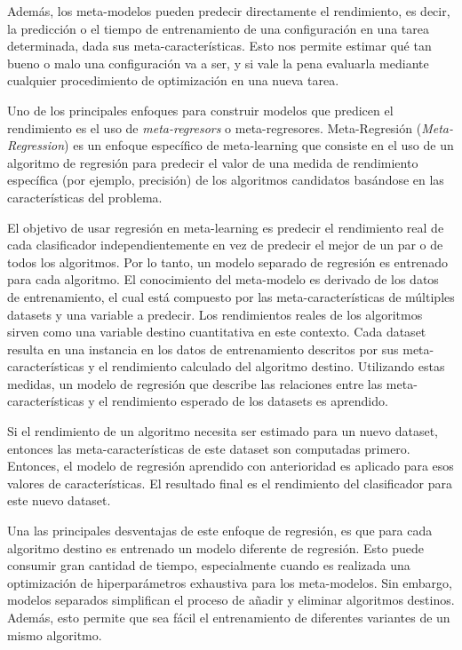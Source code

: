\quad

Además, los meta-modelos pueden predecir directamente el rendimiento, es decir, la predicción o el tiempo de entrenamiento de una configuración en una tarea determinada, dada sus meta-características. Esto nos permite estimar qué tan bueno o malo una configuración va a ser, y si vale la pena evaluarla mediante cualquier procedimiento de optimización en una nueva tarea.

Uno de los principales enfoques para construir modelos que predicen el rendimiento es el uso de \textit{meta-regresors} o meta-regresores. Meta-Regresión  (\textit{Meta-Regression}) es un enfoque específico de meta-learning que consiste en el uso de un algoritmo de regresión para predecir el valor de una medida de rendimiento específica (por ejemplo, precisión) de los algoritmos candidatos basándose en las características del problema. 

El objetivo de usar regresión en meta-learning es predecir el rendimiento real de cada clasificador independientemente en vez de predecir el mejor de un par o de todos los algoritmos. Por lo tanto, un modelo separado de regresión es entrenado para cada algoritmo. El conocimiento del meta-modelo es derivado de los datos de entrenamiento, el cual está compuesto por las meta-características de múltiples datasets y una variable a predecir. Los rendimientos reales de los algoritmos sirven como una variable destino cuantitativa en este contexto. Cada dataset resulta en una instancia en los datos de entrenamiento descritos por sus meta-características y el rendimiento calculado del algoritmo destino. Utilizando estas medidas, un modelo de regresión que describe las relaciones entre las meta-características y el rendimiento esperado de los datasets es aprendido.

Si el rendimiento de un algoritmo necesita ser estimado para un nuevo dataset, entonces las meta-características de este dataset son computadas primero. Entonces, el modelo de regresión aprendido con anterioridad es aplicado para esos valores de características. El resultado final es el rendimiento del clasificador para este nuevo dataset.

Una las principales desventajas de este enfoque de regresión, es que para cada algoritmo destino es entrenado un modelo diferente de regresión. Esto puede consumir gran cantidad de tiempo, especialmente cuando es realizada una optimización de hiperparámetros exhaustiva para los meta-modelos. Sin embargo, modelos separados simplifican el proceso de añadir y eliminar algoritmos destinos. Además, esto permite que sea fácil el entrenamiento de diferentes variantes de un mismo algoritmo.

